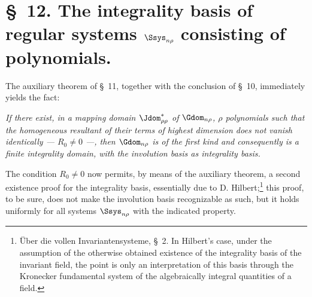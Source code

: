 \documentclass[11pt]{article}
\begin{document}
\section*{\S\ 12. The integrality basis of regular systems $\Ssys_{n\rho}$ consisting of polynomials.}

The auxiliary theorem of \S\ 11, together with the conclusion of \S\ 10, immediately yields the fact:

\emph{If there exist, in a mapping domain $\Jdom^*_{\rho\rho}$ of $\Gdom_{n\rho}$, $\rho$ polynomials such that the homogeneous resultant of their terms of highest dimension does not vanish identically --- $R_0\ne0$ ---, then $\Gdom_{n\rho}$ is of the first kind and consequently is a finite integrality domain, with the involution basis as integrality basis.}

The condition $R_0\ne0$ now permits, by means of the auxiliary theorem, a second existence proof for the integrality basis, essentially due to D. Hilbert;\footnote{Über die vollen Invariantensysteme, \S\ 2. In Hilbert's case, under the assumption of the otherwise obtained existence of the integrality basis of the invariant field, the point is only an interpretation of this basis through the Kronecker fundamental system of the algebraically integral quantities of a field.} this proof, to be sure, does not make the involution basis recognizable as such, but it holds uniformly for all systems $\Ssys_{n\rho}$ with the indicated property.
\end{document}

